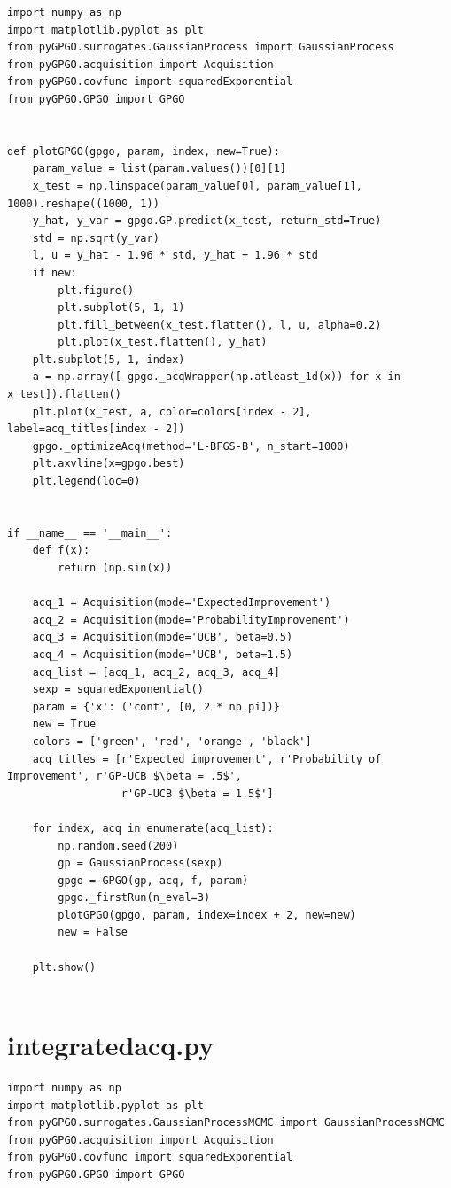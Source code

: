 \documentclass[10pt,a4paper,twoside]{book}
\begin{document}
\begin{appendices}
\begin{verbatim}
import numpy as np
import matplotlib.pyplot as plt
from pyGPGO.surrogates.GaussianProcess import GaussianProcess
from pyGPGO.acquisition import Acquisition
from pyGPGO.covfunc import squaredExponential
from pyGPGO.GPGO import GPGO


def plotGPGO(gpgo, param, index, new=True):
    param_value = list(param.values())[0][1]
    x_test = np.linspace(param_value[0], param_value[1], 1000).reshape((1000, 1))
    y_hat, y_var = gpgo.GP.predict(x_test, return_std=True)
    std = np.sqrt(y_var)
    l, u = y_hat - 1.96 * std, y_hat + 1.96 * std
    if new:
        plt.figure()
        plt.subplot(5, 1, 1)
        plt.fill_between(x_test.flatten(), l, u, alpha=0.2)
        plt.plot(x_test.flatten(), y_hat)
    plt.subplot(5, 1, index)
    a = np.array([-gpgo._acqWrapper(np.atleast_1d(x)) for x in x_test]).flatten()
    plt.plot(x_test, a, color=colors[index - 2], label=acq_titles[index - 2])
    gpgo._optimizeAcq(method='L-BFGS-B', n_start=1000)
    plt.axvline(x=gpgo.best)
    plt.legend(loc=0)


if __name__ == '__main__':
    def f(x):
        return (np.sin(x))

    acq_1 = Acquisition(mode='ExpectedImprovement')
    acq_2 = Acquisition(mode='ProbabilityImprovement')
    acq_3 = Acquisition(mode='UCB', beta=0.5)
    acq_4 = Acquisition(mode='UCB', beta=1.5)
    acq_list = [acq_1, acq_2, acq_3, acq_4]
    sexp = squaredExponential()
    param = {'x': ('cont', [0, 2 * np.pi])}
    new = True
    colors = ['green', 'red', 'orange', 'black']
    acq_titles = [r'Expected improvement', r'Probability of Improvement', r'GP-UCB $\beta = .5$',
                  r'GP-UCB $\beta = 1.5$']

    for index, acq in enumerate(acq_list):
        np.random.seed(200)
        gp = GaussianProcess(sexp)
        gpgo = GPGO(gp, acq, f, param)
        gpgo._firstRun(n_eval=3)
        plotGPGO(gpgo, param, index=index + 2, new=new)
        new = False

    plt.show()
                
\end{verbatim}

\section{integratedacq.py}
\label{integratedacq}
\begin{verbatim}
import numpy as np
import matplotlib.pyplot as plt
from pyGPGO.surrogates.GaussianProcessMCMC import GaussianProcessMCMC
from pyGPGO.acquisition import Acquisition
from pyGPGO.covfunc import squaredExponential
from pyGPGO.GPGO import GPGO



\end{verbatim}
\end{appendices}
\end{document}
